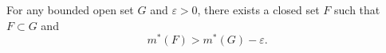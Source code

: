 \begin{lemma}[Lemma 3.6]
For any bounded open set $G$ and $\varepsilon > 0$, there exists a closed set $F$ such that $F \subset G$ and
$$
m^*(F) > m^*(G) - \varepsilon.
$$
\end{lemma}
